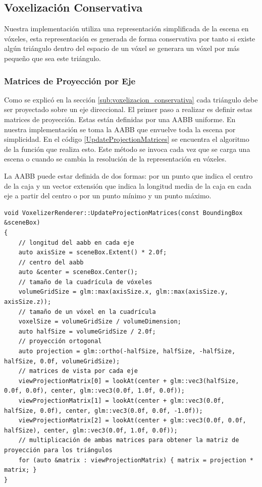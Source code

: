 \subsection{Voxelización Conservativa} %
\label{sub:voxelization_impl}
Nuestra implementación utiliza una representación simplificada de la escena en vóxeles, esta representación es generada de forma conservativa por tanto si existe algún triángulo dentro del espacio de un vóxel se generara un vóxel por más pequeño que sea este triángulo.
 
\subsubsection{Matrices de Proyección por Eje}

Como se explicó en la sección \ref{sub:voxelizacion_conservativa} cada triángulo debe ser proyectado sobre un eje direccional. El primer paso a realizar es definir estas matrices de proyección. Estas están definidas por una \ac{AABB} uniforme. En nuestra implementación se toma la \ac{AABB} que envuelve toda la escena por simplicidad. En el código \ref{UpdateProjectionMatrices} se encuentra el algoritmo de la función que realiza esto. Este método se invoca cada vez que se carga una escena o cuando se cambia la resolución de la representación en vóxeles.

La \ac{AABB} puede estar definida de dos formas: por un punto que indica el centro de la caja y un vector extensión que indica la longitud media de la caja en cada eje a partir del centro o por un punto mínimo y un punto máximo. 
\\
\begin{lstlisting}[caption={Creación de matrices de proyección ortogonal por cada eje direccional}, label=UpdateProjectionMatrices]
void VoxelizerRenderer::UpdateProjectionMatrices(const BoundingBox &sceneBox)
{
    // longitud del aabb en cada eje
    auto axisSize = sceneBox.Extent() * 2.0f;
    // centro del aabb
    auto &center = sceneBox.Center();
    // tamaño de la cuadrícula de vóxeles
    volumeGridSize = glm::max(axisSize.x, glm::max(axisSize.y, axisSize.z));
    // tamaño de un vóxel en la cuadrícula
    voxelSize = volumeGridSize / volumeDimension;
    auto halfSize = volumeGridSize / 2.0f;
    // proyección ortogonal
    auto projection = glm::ortho(-halfSize, halfSize, -halfSize, halfSize, 0.0f, volumeGridSize);
    // matrices de vista por cada eje
    viewProjectionMatrix[0] = lookAt(center + glm::vec3(halfSize, 0.0f, 0.0f), center, glm::vec3(0.0f, 1.0f, 0.0f));
    viewProjectionMatrix[1] = lookAt(center + glm::vec3(0.0f, halfSize, 0.0f), center, glm::vec3(0.0f, 0.0f, -1.0f));
    viewProjectionMatrix[2] = lookAt(center + glm::vec3(0.0f, 0.0f, halfSize), center, glm::vec3(0.0f, 1.0f, 0.0f));
    // multiplicación de ambas matrices para obtener la matriz de proyección para los triángulos
    for (auto &matrix : viewProjectionMatrix) { matrix = projection * matrix; }
}
\end{lstlisting}

